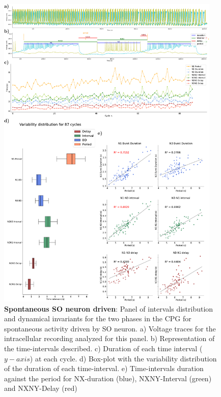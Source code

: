 \begin{figure}[htbp]
	\centering
	\includegraphics[width=0.95\textwidth]{./img/invariants/data/SUSSEX/prep4_so_driven_2/images/panel_with_intervals.pdf}
	\caption{\textbf{Spontaneous SO neuron driven}: Panel of intervals distribution and dynamical invariants for the two phases in the CPG for spontaneous activity driven by SO neuron. a) Voltage traces for the intracellular recording analyzed for this panel. b) Representation of the time-intervals described. c) Duration of each time interval ($y-axis$) at each cycle. d) Box-plot with the variability distribution of the duration of each time-interval. e) Time-intervals duration against the period for NX-duration (blue), NXNY-Interval (green) and NXNY-Delay (red)}
	\label{fig:so spontaneous invariants 2}
\end{figure}


